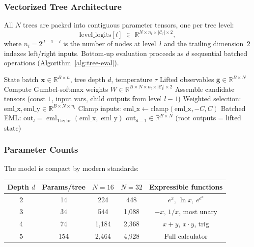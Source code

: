 \documentclass[11pt]{article}
\DeclareMathOperator{\eml}{eml}
\newcommand{\bx}{\mathbf{x}}
\newcommand{\bg}{\mathbf{g}}
\newcommand{\R}{\mathbb{R}}
\newcommand{\cC}{\mathcal{C}}
\begin{document}
\subsubsection{Vectorized Tree Architecture}

All $N$ trees are packed into contiguous parameter tensors, one per tree level:
\begin{equation}
  \text{level\_logits}[l] \;\in\; \R^{N \times n_l \times |\cC_l| \times 2},
\end{equation}
where $n_l = 2^{d-1-l}$ is the number of nodes at level~$l$ and the trailing
dimension~2 indexes left/right inputs.  Bottom-up evaluation proceeds as $d$
sequential batched operations (Algorithm~\ref{alg:tree-eval}).

\begin{algorithm}[t]
\caption{Vectorized EML Tree Evaluation}
\label{alg:tree-eval}
\begin{algorithmic}[1]
\REQUIRE State batch $\bx \in \R^{B \times n}$, tree depth $d$, temperature $\tau$
\ENSURE Lifted observables $\bg \in \R^{B \times N}$
  \STATE Compute Gumbel-softmax weights
    $W \in \R^{B \times N \times n_l \times |\cC_l| \times 2}$
  \STATE Assemble candidate tensors (const $1$, input vars, child outputs from
    level $l\!-\!1$)
  \STATE Weighted selection:
    $\text{eml\_x}, \text{eml\_y} \in \R^{B \times N \times n_l}$
  \STATE Clamp inputs:
    $\text{eml\_x} \gets \text{clamp}(\text{eml\_x}, -C, C)$
  \STATE Batched EML:
    $\text{out}_l = \eml_{\text{Taylor}}(\text{eml\_x},\; \text{eml\_y})$
\ENDFOR
\RETURN $\text{out}_{d-1} \in \R^{B \times N}$ (root outputs = lifted state)
\end{algorithmic}
\end{algorithm}

\subsubsection{Parameter Counts}

The model is compact by modern standards:

\begin{center}
\begin{tabular}{ccccc}
\toprule
Depth $d$ & Params/tree & $N\!=\!16$ & $N\!=\!32$ & Expressible functions \\
\midrule
2 & 14 & 224 & 448 & $e^x$, $\ln x$, $e^{e^x}$ \\
3 & 34 & 544 & 1,088 & $-x$, $1/x$, most unary \\
4 & 74 & 1,184 & 2,368 & $x+y$, $x \cdot y$, trig \\
5 & 154 & 2,464 & 4,928 & Full calculator \\
\bottomrule
\end{tabular}
\end{center}
\end{document}
